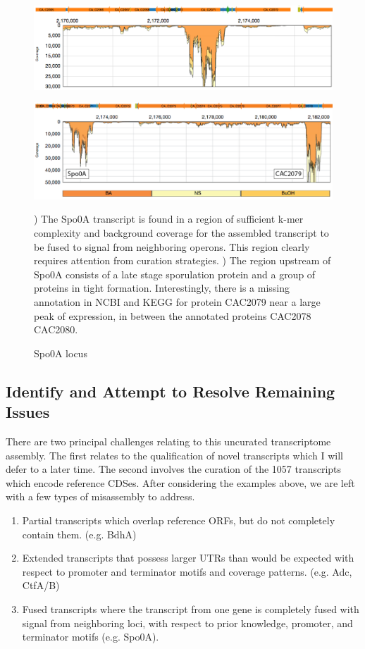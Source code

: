 \begin{figure}
\small
{\includegraphics[width=\textwidth,height=1.5in]{images/Assembly/Examples/Spo0A/Spo0A-locus.png}
\label{fig:6a}}
{\includegraphics[width=\textwidth]{images/Assembly/Examples/Spo0A/CAC2079.png}
\label{fig:6b}}

\caption{Spo0A locus}
) The Spo0A transcript is found in a region of sufficient k-mer complexity and background coverage for the assembled transcript to be fused to signal from neighboring operons. This region clearly requires attention from curation strategies. ) The region upstream of Spo0A consists of a late stage sporulation protein and a group of proteins in tight formation. Interestingly, there is a missing annotation in NCBI and KEGG for protein CAC2079 near a large peak of expression, in between the annotated proteins CAC2078 CAC2080.
\end{figure}


\subsection{Identify and Attempt to Resolve Remaining Issues}
There are two principal challenges relating to this uncurated transcriptome assembly. The first relates to the qualification of novel transcripts which I will defer to a later time. The second involves the curation of the 1057 transcripts which encode reference CDSes. After considering the examples above, we are left with a few types of misassembly to address.
\begin{enumerate}
\item Partial transcripts which overlap reference ORFs, but do not completely contain them. (e.g. BdhA)
\item Extended transcripts that possess larger UTRs than would be expected with respect to promoter and terminator motifs and coverage patterns. (e.g. Adc, CtfA/B)
\item Fused transcripts where the transcript from one gene is completely fused with signal from neighboring loci, with respect to prior knowledge, promoter, and terminator motifs (e.g. Spo0A).
\end{enumerate}

